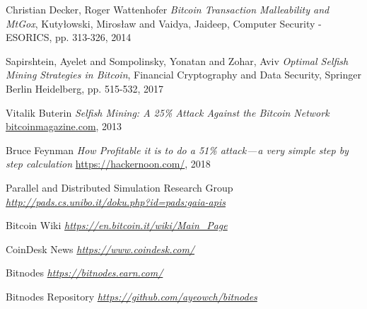 \begin{thebibliography}{99}
 Christian Decker, Roger Wattenhofer
{\em Bitcoin Transaction Malleability and MtGox},
Kuty{\l}owski, Miros{\l}aw and Vaidya, Jaideep, Computer Security - ESORICS, pp. 313-326, 2014

 Sapirshtein, Ayelet and Sompolinsky, Yonatan and Zohar, Aviv
{\em Optimal Selfish Mining Strategies in Bitcoin},
Financial Cryptography and Data Security, Springer Berlin Heidelberg, pp. 515-532, 2017

 Vitalik Buterin
{\em Selfish Mining: A 25\% Attack Against the Bitcoin Network}
\url{bitcoinmagazine.com}, 2013

 Bruce Feynman
{\em How Profitable it is to do a 51\% attack — a very simple step by step calculation}
\url{https://hackernoon.com/}, 2018

 Parallel and Distributed Simulation Research Group
{\em \url{http://pads.cs.unibo.it/doku.php?id=pads:gaia-apis}}

 Bitcoin Wiki
{\em \url{https://en.bitcoin.it/wiki/Main_Page}}

 CoinDesk News
{\em \url{https://www.coindesk.com/}}

 Bitnodes
{\em \url{https://bitnodes.earn.com/}}

 Bitnodes Repository
{\em \url{https://github.com/ayeowch/bitnodes}}

\end{thebibliography}

